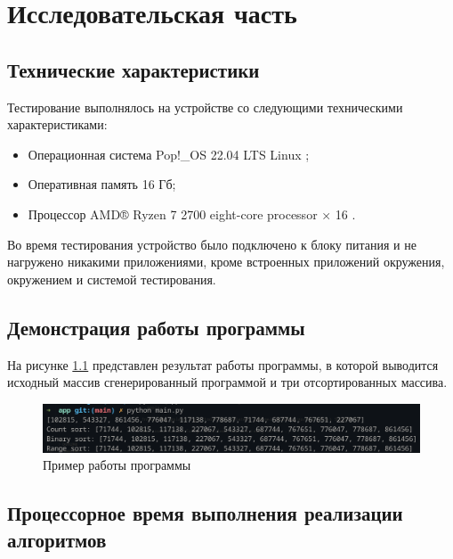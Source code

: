\chapter{Исследовательская часть}
\section{Технические характеристики}
Тестирование выполнялось на устройстве со следующими техническими характеристиками:
\begin{itemize}
	\item Операционная система Pop!\_OS 22.04 LTS \cite{ubuntu} Linux \cite{linux};
	\item Оперативная память 16 Гб;
	\item Процессор AMD® Ryzen 7 2700 eight-core processor × 16 \cite{amd}.
\end{itemize}
Во время тестирования устройство было подключено к блоку питания и не нагружено никакими приложениями, кроме встроенных приложений окружения, окружением и системой тестирования.

\section{Демонстрация работы программы}



На рисунке \ref{demonstration} представлен результат работы программы, в которой выводится исходный массив сгенерированный программой и три отсортированных массива.

\begin{figure}[ht!]
	\begin{center}
		\captionsetup{singlelinecheck = false, justification=centerfirst}
		\includegraphics[scale=0.8]{assets/demonstation.png}
		\caption{Пример работы программы}
		\label{demonstration}
	\end{center}
	
	
\end{figure}

\newpage

\section{Процессорное время выполнения реализации алгоритмов}

